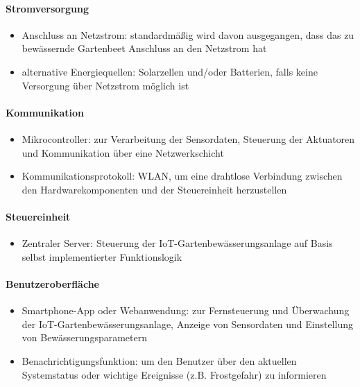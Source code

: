 \paragraph{Stromversorgung}
\begin{itemize}
\item Anschluss an Netzstrom: standardmäßig wird davon ausgegangen, dass das zu bewässernde Gartenbeet Anschluss an den Netzstrom hat
\item alternative Energiequellen: Solarzellen und/oder Batterien, falls keine Versorgung über Netzstrom möglich ist
\end{itemize}

\paragraph{Kommunikation}
\begin{itemize}
\item Mikrocontroller: zur Verarbeitung der Sensordaten, Steuerung der Aktuatoren und Kommunikation über eine Netzwerkschicht
\item Kommunikationsprotokoll: WLAN, um eine drahtlose Verbindung zwischen den Hardwarekomponenten und der Steuereinheit herzustellen
\end{itemize}

\paragraph{Steuereinheit}
\begin{itemize}
\item Zentraler Server: Steuerung der IoT-Gartenbewässerungsanlage auf Basis selbst implementierter Funktionslogik
\end{itemize}

\paragraph{Benutzeroberfläche}
\begin{itemize}
\item Smartphone-App oder Webanwendung: zur Fernsteuerung und Überwachung der IoT-Gartenbewässerungsanlage, Anzeige von Sensordaten und Einstellung von Bewässerungsparametern
\item Benachrichtigungsfunktion: um den Benutzer über den aktuellen Systemstatus oder wichtige Ereignisse (z.B. Frostgefahr) zu informieren
\end{itemize}

